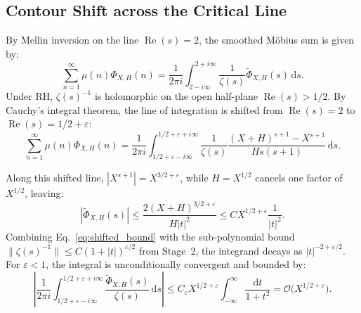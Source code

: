 \documentclass[11pt,a4paper]{article}
\theoremstyle{definition}
\newcommand{\dee}{\mathrm{d}}
\begin{document}
\subsection{Contour Shift across the Critical Line}
By Mellin inversion on the line $\operatorname{Re}(s) = 2$, the smoothed M\"obius sum is given by:
\begin{equation}
\label{eq:smoothed_sum}
\sum_{n=1}^\infty \mu(n) \Phi_{X,H}(n) = \frac{1}{2\pi i} \int_{2 - i\infty}^{2 + i\infty} \frac{1}{\zeta(s)} \widetilde{\Phi}_{X,H}(s)\,\dee s.
\end{equation}
Under RH, $\zeta(s)^{-1}$ is holomorphic on the open half-plane $\operatorname{Re}(s) > 1/2$. By Cauchy's integral theorem, the line of integration is shifted from $\operatorname{Re}(s) = 2$ to $\operatorname{Re}(s) = 1/2 + \varepsilon$:
\begin{equation}
\label{eq:shifted_contour}
\sum_{n=1}^\infty \mu(n) \Phi_{X,H}(n) = \frac{1}{2\pi i} \int_{1/2+\varepsilon - i\infty}^{1/2+\varepsilon + i\infty} \frac{1}{\zeta(s)} \frac{(X+H)^{s+1} - X^{s+1}}{H s (s+1)}\,\dee s.
\end{equation}

Along this shifted line, $|X^{s+1}| = X^{3/2+\varepsilon}$, while $H = X^{1/2}$ cancels one factor of $X^{1/2}$, leaving:
\begin{equation}
\label{eq:shifted_bound}
\left|\widetilde{\Phi}_{X,H}(s)\right| \le \frac{2 (X+H)^{3/2+\varepsilon}}{H |t|^2} \le C X^{1/2+\varepsilon} \frac{1}{|t|^2}.
\end{equation}
Combining Eq.~\eqref{eq:shifted_bound} with the sub-polynomial bound $\|\zeta(s)^{-1}\| \le C (1 + |t|)^{\varepsilon/2}$ from Stage~2, the integrand decays as $|t|^{-2 + \varepsilon/2}$. For $\varepsilon < 1$, the integral is unconditionally convergent and bounded by:
\begin{equation}
\label{eq:contour_integral_bound}
\left| \frac{1}{2\pi i} \int_{1/2+\varepsilon - i\infty}^{1/2+\varepsilon + i\infty} \frac{\widetilde{\Phi}_{X,H}(s)}{\zeta(s)}\,\dee s \right| \le C_\varepsilon X^{1/2+\varepsilon} \int_{-\infty}^\infty \frac{\dee t}{1 + t^2} = \mathcal{O}\bigl(X^{1/2+\varepsilon}\bigr).
\end{equation}
\end{document}
